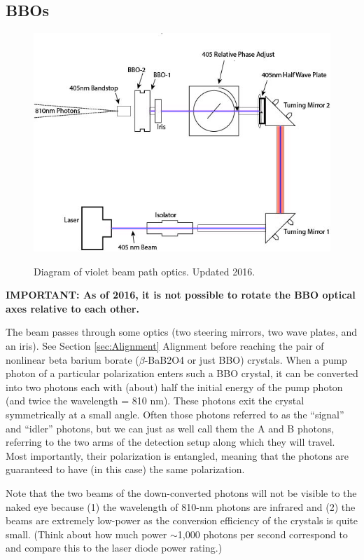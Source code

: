 \documentclass{../lab}
\begin{document}
\subsection{BBOs}

\begin{figure}[h]
    \centering
    \href{http://experimentationlab.berkeley.edu/sites/default/files/violetbeamdiagram2.jpg}{\includegraphics[width=0.5\linewidth]{images/violetbeamdiagram2.jpg}}
    \caption{Diagram of violet beam path optics. Updated 2016.}
\end{figure}

\textbf{IMPORTANT: As of 2016, it is not possible to rotate the BBO optical axes relative to each other.}

The beam passes through some optics (two steering mirrors, two wave plates, and an iris). See Section \ref{sec:Alignment} Alignment before reaching the pair of nonlinear beta barium borate ($\beta$-BaB2O4 or just BBO) crystals. When a pump photon of a particular polarization enters such a BBO crystal, it can be converted into two photons each with (about) half the initial energy of the pump photon (and twice the wavelength = 810 nm). These photons exit the crystal symmetrically at a small angle. Often those photons referred to as the ``signal'' and ``idler'' photons, but we can just as well call them the A and B photons, referring to the two arms of the detection setup along which they will travel. Most importantly, their polarization is entangled, meaning that the photons are guaranteed to have (in this case) the same polarization.

Note that the two beams of the down-converted photons will not be visible to the naked eye because (1) the wavelength of 810-nm photons are infrared and (2) the beams are extremely low-power as the conversion efficiency of the crystals is quite small. (Think about how much power $\sim$1,000 photons per second correspond to and compare this to the laser diode power rating.)
\end{document}
